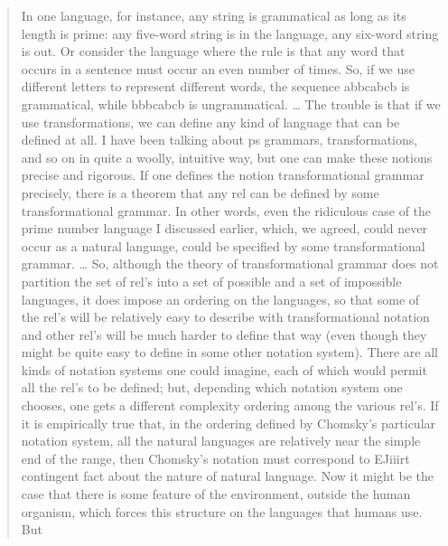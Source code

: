 \begin{quote}
    In one language, for instance, any string is grammatical as long as its length is prime: any five-word string is in the language, any six-word string is out. Or consider the language where the rule is that any word that occurs in a sentence must occur an even number of times. So, if we use different letters to represent different words, the sequence abbcabcb is grammatical, while bbbcabcb is ungrammatical. \hfill\citep[54]{Sampson1975}
    \dots
    The trouble is that if we use transformations, we can define any kind of language that can be defined at all. I have been talking about ps grammars, transformations, and so on in quite a woolly, intuitive way, but one can make these notions precise and rigorous. If one defines the notion transformational grammar precisely, there is a theorem that any rel can be defined by some transformational grammar. In other words, even the ridiculous case of the prime number language I discussed earlier, which, we agreed, could never occur as a natural language, could be specified by some transformational grammar.
    \dots
    So, although the theory of transformational grammar does not partition the set of rel's into a set of possible and a set of impossible languages, it does impose an ordering on the languages, so that some of the rel's will be relatively easy to describe with transformational notation and other rel's will be much harder to define that way (even though they might be quite easy to define in some other notation system). There are all kinds of notation systems one could imagine, each of which would permit all the rel's to be defined; but, depending which notation system one chooses, one gets a different complexity ordering among the various rel's. If it is empirically true that, in the ordering defined by Chomsky's particular notation system, all the natural languages are relatively near the simple end of the range, then Chomsky's notation must correspond to %
    EJiiirt contingent fact about the nature of natural language. Now it might be the case that there is some feature of the environment, outside the human organism, which forces this structure on the languages that humans use. But %
    \hfill\citep[56]{Sampson1975}
\end{quote}


